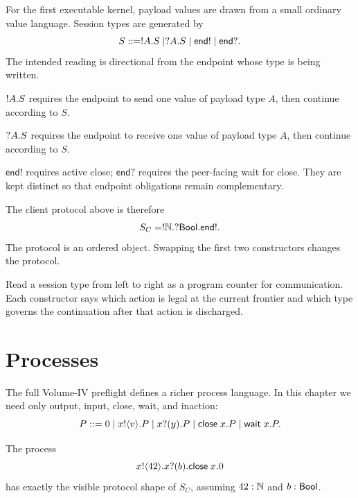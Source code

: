 For the first executable kernel, payload values are drawn from a small ordinary value language.
Session types are generated by
\[
  S ::= !A.S \mid ?A.S \mid \mathsf{end!} \mid \mathsf{end?}.
\]
The intended reading is directional from the endpoint whose type is being written.

\begin{definition}
\(!A.S\) requires the endpoint to send one value of payload type \(A\), then continue
according to \(S\).
\end{definition}

\begin{definition}
\(?A.S\) requires the endpoint to receive one value of payload type \(A\), then continue
according to \(S\).
\end{definition}

\begin{definition}
\(\mathsf{end!}\) requires active close; \(\mathsf{end?}\) requires the peer-facing wait for close.
They are kept distinct so that endpoint obligations remain complementary.
\end{definition}

The client protocol above is therefore
\[
  S_C = !\mathbb{N}.?\mathsf{Bool}.\mathsf{end!}.
\]
The protocol is an ordered object. Swapping the first two constructors changes the protocol.



\begin{intuition}
Read a session type from left to right as a program counter for communication. Each constructor
says which action is legal at the current frontier and which type governs the continuation after
that action is discharged.
\end{intuition}

\section{Processes}

The full Volume-IV preflight defines a richer process language. In this chapter we need only
output, input, close, wait, and inaction:
\[
 P ::= 0
 \mid x!\langle v\rangle.P
 \mid x?(y).P
 \mid \mathsf{close}\;x.P
 \mid \mathsf{wait}\;x.P.
\]

The process
\[
  x!\langle 42\rangle.x?(b).\mathsf{close}\;x.0
\]
has exactly the visible protocol shape of \(S_C\), assuming \(42:\mathbb{N}\) and \(b:\mathsf{Bool}\).

